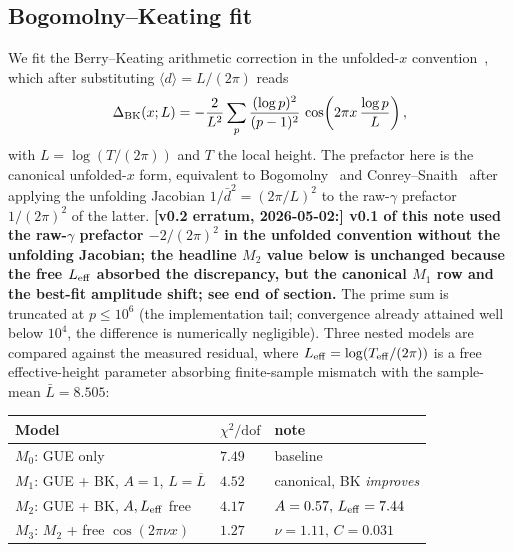 \documentclass[aps,prd,superscriptaddress,nofootinbib,floatfix,10pt]{revtex4-2}
\begin{document}
\subsection{Bogomolny--Keating fit}

We fit the Berry--Keating arithmetic correction in the unfolded-$x$ convention~\cite[eq.~(4.20)]{BerryKeating1999}, which after substituting $\langle d \rangle = L/(2\pi)$ reads
\begin{equation}
 \Delta_{\rm BK}(x; L) = -\frac{2}{L^{2}}
 \sum_{p} \frac{(\log p)^{2}}{(p-1)^{2}}\,
 \cos\!\left(2\pi x \,\frac{\log p}{L}\right),
\end{equation}
with $L = \log(T/(2\pi))$ and $T$ the local height. The prefactor here is the canonical unfolded-$x$ form, equivalent to Bogomolny~\cite[eq.~(57) + p.~62 unfolding rule]{Bogomolny2003} and Conrey--Snaith~\cite[Thm.~4.1]{ConreySnaith2007} after applying the unfolding Jacobian $1/\bar d^{2} = (2\pi/L)^{2}$ to the raw-$\gamma$ prefactor $1/(2\pi)^{2}$ of the latter. \textbf{[v0.2 erratum, 2026-05-02:] v0.1 of this note used the raw-$\gamma$ prefactor $-2/(2\pi)^{2}$ in the unfolded convention without the unfolding Jacobian; the headline $M_{2}$ value below is unchanged because the free $L_{\rm eff}$ absorbed the discrepancy, but the canonical $M_{1}$ row and the best-fit amplitude shift; see end of section.} The prime sum is
truncated at $p \le 10^{6}$ (the implementation tail; convergence
already attained well below $10^{4}$, the difference is numerically
negligible). Three nested models are compared against the measured
residual, where $L_{\rm eff} = \log(T_{\rm eff}/(2\pi))$ is a free
effective-height parameter absorbing finite-sample mismatch with the
sample-mean $\bar{L} = 8.505$:

\begin{center}
\begin{tabular}{lll}
\hline
Model & $\chi^{2}/\mathrm{dof}$ & note \\
\hline
$M_0$: GUE only                                 & $7.49$ & baseline \\
$M_1$: GUE + BK, $A=1$, $L = \overline{L}$       & $4.52$ & canonical, BK \textit{improves} \\
$M_2$: GUE + BK, $A,L_{\rm eff}$ free            & $4.17$ & $A=0.57,\,
                                                  L_{\rm eff}=7.44$ \\
$M_3$: $M_2$ + free $\cos(2\pi\nu x)$            & $1.27$ & $\nu=1.11,\,
                                                  C=0.031$ \\
\hline
\end{tabular}
\end{center}
\end{document}

